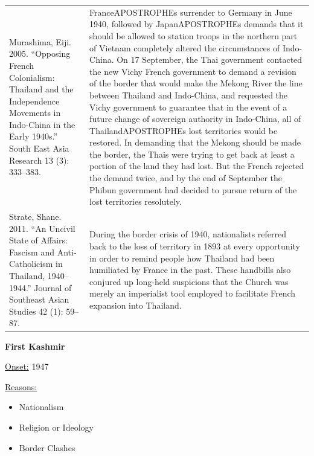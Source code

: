 {\begin{longtable}{p{}p{}}
\\
Murashima, Eiji. 2005. “Opposing French Colonialism: Thailand and the Independence Movements in Indo-China in the Early 1940s.” South East Asia Research 13 (3): 333–383. & FranceAPOSTROPHEs surrender to Germany in June 1940, followed by JapanAPOSTROPHEs demands that it should be allowed to station troops in the northern part of Vietnam completely altered the circumstances of Indo-China. On 17 September, the Thai government contacted the new Vichy French government to demand a revision of the border that would make the Mekong River the line between Thailand and Indo-China, and requested the Vichy government to guarantee that in the event of a future change of sovereign authority in Indo-China, all of ThailandAPOSTROPHEs lost territories would be restored. In demanding that the Mekong should be made the border, the Thais were trying to get back at least a portion of the land they had lost. But the French rejected the demand twice, and by the end of September the Phibun government had decided to pursue return of the lost territories resolutely.
\\
Strate, Shane. 2011. “An Uncivil State of Affairs: Fascism and Anti-Catholicism in Thailand, 1940–1944.” Journal of Southeast Asian Studies 42 (1): 59–87. & During the border crisis of 1940, nationalists referred back to the loss of territory in 1893 at every opportunity in order to remind people how Thailand had been humiliated by France in the past. These handbills also conjured up long-held suspicions that the Church was merely an imperialist tool employed to facilitate French expansion into Thailand.
\\
\end{longtable}}
\clearpage
         \textbf{First Kashmir} 

          \underline{Onset:} 1947         

\underline{Reasons:}
\begin{itemize}
\item Nationalism
\item Religion or Ideology
\item Border Clashes
\end{itemize}

